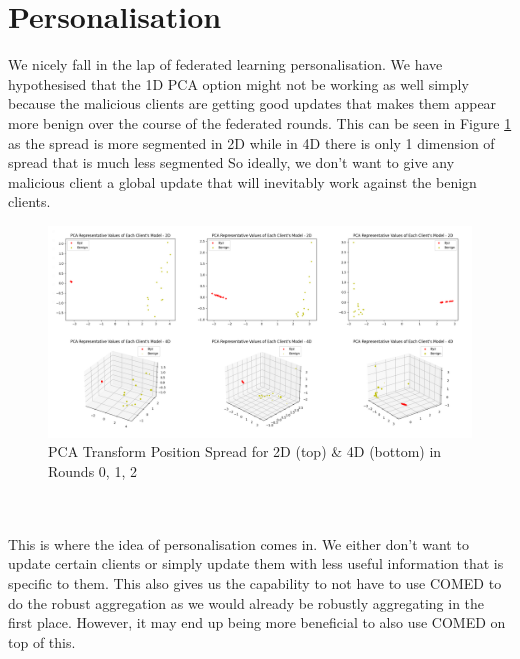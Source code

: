 \section{Personalisation}
We nicely fall in the lap of federated learning personalisation.
We have hypothesised that the 1D PCA option might not be working as well simply because the malicious clients are getting good updates that makes them appear more benign over the course of the federated rounds.
This can be seen in Figure \ref{fig:mal_spread} as the spread is more segmented in 2D while in 4D there is only 1 dimension of spread that is much less segmented
So ideally, we don't want to give any malicious client a global update that will inevitably work against the benign clients.
\begin{figure}[htbp]
	\centering
    \includegraphics[scale=0.24]{my_agg/graphs/mal_spread.png}
	\caption{PCA Transform Position Spread for 2D (top) \& 4D (bottom) in Rounds 0, 1, 2}
	\label{fig:mal_spread}
\end{figure}
\\ \\
This is where the idea of personalisation comes in.
We either don't want to update certain clients or simply update them with less useful information that is specific to them.
This also gives us the capability to not have to use COMED to do the robust aggregation as we would already be robustly aggregating in the first place.
However, it may end up being more beneficial to also use COMED on top of this.



